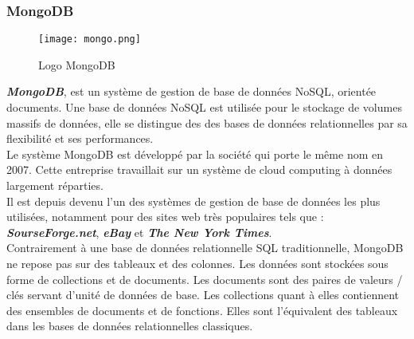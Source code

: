 \subsubsection{MongoDB}
\vspace{1cm}
\begin{figure}[H]
    \centering
    \texttt{[image: mongo.png]}
    \vspace{1cm}
    \caption{Logo MongoDB}
    \label{fig:mongo_logo}
\end{figure}
\textit{\textbf{MongoDB}}, est un système de gestion de base de données NoSQL, orientée documents. Une base de données NoSQL est utilisée pour le stockage de volumes massifs de données, elle se distingue des des bases de données relationnelles par sa flexibilité et ses performances.\\
\noindent Le système MongoDB est développé par la société qui porte le même nom en 2007. Cette entreprise travaillait sur un système de cloud computing à données largement réparties.\\
\noindent Il est depuis devenu l'un des systèmes de gestion de base de données les plus utilisées, notamment pour des sites web très populaires tels que : \textit{\textbf{SourseForge.net}}, \textit{\textbf{eBay}} et \textit{\textbf{The New York Times}}.\\
\noindent Contrairement à une base de données relationnelle SQL traditionnelle, MongoDB ne repose pas sur des tableaux et des colonnes. Les données sont stockées sous forme de collections et de documents.
Les documents sont des paires de valeurs / clés servant d'unité de données de base. Les collections quant à elles contiennent des ensembles de documents et de fonctions. Elles sont l'équivalent des tableaux dans les bases de données relationnelles classiques.
